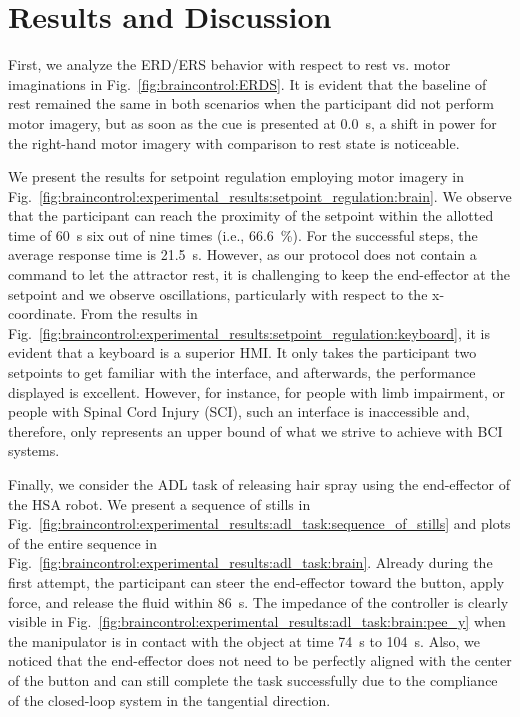 \section{Results and Discussion}\label{sec:braincontrol:results_and_discussion}

First, we analyze the \gls{ERD}/\gls{ERS} behavior with respect to rest vs. motor imaginations in Fig.~\ref{fig:braincontrol:ERDS}. It is evident that the baseline of rest remained the same in both scenarios when the participant did not perform motor imagery, but as soon as the cue is presented at \SI{0.0}{s}, a shift in power for the right-hand motor imagery with comparison to rest state is noticeable. 

We present the results for setpoint regulation employing motor imagery in Fig.~\ref{fig:braincontrol:experimental_results:setpoint_regulation:brain}. 
We observe that the participant can reach the proximity of the setpoint within the allotted time of \SI{60}{s} six out of nine times (i.e., \SI{66.6}{\percent}).
For the successful steps, the average response time is \SI{21.5}{s}.
However, as our protocol does not contain a command to let the attractor rest, it is challenging to keep the end-effector at the setpoint and we observe oscillations, particularly with respect to the x-coordinate.
From the results in Fig.~\ref{fig:braincontrol:experimental_results:setpoint_regulation:keyboard}, it is evident that a keyboard is a superior \gls{HMI}. It only takes the participant two setpoints to get familiar with the interface, and afterwards, the performance displayed is excellent.
However, for instance, for people with limb impairment, or people with Spinal Cord Injury (SCI), such an interface is inaccessible and, therefore, only represents an upper bound of what we strive to achieve with \gls{BCI} systems.

Finally, we consider the \gls{ADL} task of releasing hair spray using the end-effector of the \gls{HSA} robot. We present a sequence of stills in Fig.~\ref{fig:braincontrol:experimental_results:adl_task:sequence_of_stills} and plots of the entire sequence in Fig.~\ref{fig:braincontrol:experimental_results:adl_task:brain}.
Already during the first attempt, the participant can steer the end-effector toward the button, apply force, and release the fluid within \SI{86}{s}.
The impedance of the controller is clearly visible in Fig.~\ref{fig:braincontrol:experimental_results:adl_task:brain:pee_y} when the manipulator is in contact with the object at time \SI{74}{s} to \SI{104}{s}.
Also, we noticed that the end-effector does not need to be perfectly aligned with the center of the button and can still complete the task successfully due to the compliance of the closed-loop system in the tangential direction.

